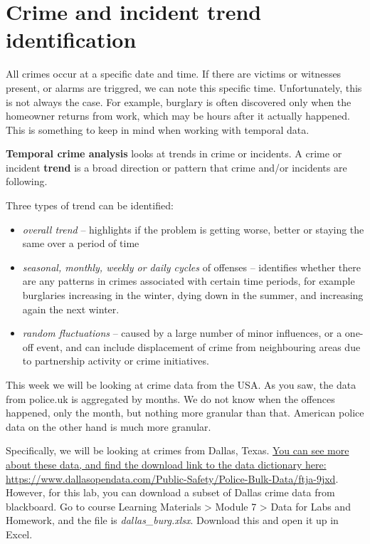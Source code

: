 \documentclass[
]{book}
\providecommand{\tightlist}{%
  \setlength{\itemsep}{0pt}\setlength{\parskip}{0pt}}
\begin{document}
\hypertarget{crime-and-incident-trend-identification}{%
\section{Crime and incident trend identification}\label{crime-and-incident-trend-identification}}

All crimes occur at a specific date and time. If there are victims or witnesses present, or alarms are triggred, we can note this specific time. Unfortunately, this is not always the case. For example, burglary is often discovered only when the homeowner returns from work, which may be hours after it actually happened. This is something to keep in mind when working with temporal data.

\textbf{Temporal crime analysis} looks at trends in crime or incidents. A crime or incident \textbf{trend} is a broad direction or pattern that crime and/or incidents are following.

Three types of trend can be identified:

\begin{itemize}
\tightlist
\item
  \emph{overall trend} -- highlights if the problem is getting worse, better or staying the same over a period of time
\item
  \emph{seasonal, monthly, weekly or daily cycles} of offenses -- identifies whether there are any patterns in crimes associated with certain time periods, for example burglaries increasing in the winter, dying down in the summer, and increasing again the next winter.
\item
  \emph{random fluctuations} -- caused by a large number of minor influences, or a one-off event, and can include displacement of crime from neighbouring areas due to partnership activity or crime initiatives.
\end{itemize}

This week we will be looking at crime data from the USA. As you saw, the data from police.uk is aggregated by months. We do not know when the offences happened, only the month, but nothing more granular than that. American police data on the other hand is much more granular.

Specifically, we will be looking at crimes from Dallas, Texas. \href{https://www.dallasopendata.com/Public-Safety/Police-Bulk-Data/ftja-9jxd}{You can see more about these data, and find the download link to the data dictionary here: https://www.dallasopendata.com/Public-Safety/Police-Bulk-Data/ftja-9jxd}. However, for this lab, you can download a subset of Dallas crime data from blackboard. Go to course Learning Materials \textgreater{} Module 7 \textgreater{} Data for Labs and Homework, and the file is \emph{dallas\_burg.xlsx}. Download this and open it up in Excel.
\end{document}
